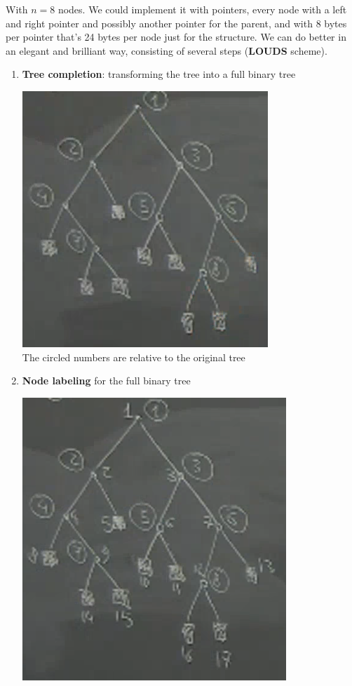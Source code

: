 \documentclass[10pt]{report}
\begin{document}
With $n=8$ nodes. We could implement it with pointers, every node with a left and right pointer and possibly another pointer for the parent, and with 8 bytes per pointer that's 24 bytes per node just for the structure. We can do better in an elegant and brilliant way, consisting of several steps (\textbf{LOUDS} scheme).\begin{enumerate}
	\item \textbf{Tree completion}: transforming the tree into a full binary tree\begin{center}
		\includegraphics[scale=0.5]{15.png}\\
		The circled numbers are relative to the original tree
	\end{center}
	\item \textbf{Node labeling} for the full binary tree \begin{center}
		\includegraphics[scale=0.5]{16.png}

\end{center}
\end{enumerate}
\end{document}
